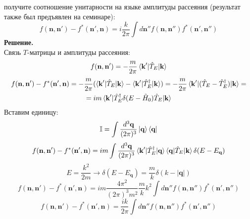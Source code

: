 \documentclass[12pt]{article}
\theoremstyle{definition}
\begin{document}
получите соотношение унитарности на языке амплитуды рассеяния (результат также был предъявлен на семинаре):
\begin{equation}
    f(\textbf{n}, \textbf{n}') - f^*(\textbf{n}',\textbf{n}) = i\frac{k}{2\pi}\int d\textbf{n}''f(\textbf{n},\textbf{n}'')f^*(\textbf{n}', \textbf{n}'')
\end{equation}
\textbf{Решение.}\\
Связь $T$-матрицы и амплитуды рассеяния:
\begin{equation}
    f(\textbf{n},\textbf{n}')=-\frac{m}{2\pi}\braket{\textbf{k}'|\hat{T}_E|\textbf{k}}
\end{equation}
\begin{multline}
    f(\textbf{n},\textbf{n}')-f^*(\textbf{n}',\textbf{n})=-\frac{m}{2\pi}(\braket{\textbf{k}'|\hat{T}_E|\textbf{k}}-\braket{\textbf{k}'|\hat{T}^\dagger_E|\textbf{k}})=-\frac{m}{2\pi}\braket{\textbf{k}'|(\hat{T}_E-\hat{T}^\dagger_E)|\textbf{k}}=\\=im\braket{\textbf{k}'|\hat{T}^\dagger_E\delta(E-\hat{H}_0)\hat{T}_E|\textbf{k}}
\end{multline}
Вставим единицу:
\begin{equation}
    \mathbb{I}=\int\frac{d^3\textbf{q}}{(2\pi)^3}\ket{\textbf{q}}\bra{\textbf{q}}
\end{equation}
\begin{equation}
    f(\textbf{n},\textbf{n}')-f^*(\textbf{n}',\textbf{n})=im\int\frac{d^3\textbf{q}}{(2\pi)^3}\braket{\textbf{k}'|\hat{T}^\dagger_E|\textbf{q}}\braket{\textbf{q}|\hat{T}_E|\textbf{k}}\delta(E-E_{\textbf{q}})
\end{equation}
\begin{equation}
    E=\frac{k^2}{2m}\rightarrow\delta(E-E_{\textbf{q}})=\frac{m}{k}\delta(k-|\textbf{q}|)
\end{equation}
\begin{equation}
    f(\textbf{n},\textbf{n}')-f^*(\textbf{n}',\textbf{n})=im\frac{4\pi^2}{(2\pi)^3m^2}\frac{m}{k}k^2\int d\textbf{n}''f(\textbf{n},\textbf{n}'')f^*(\textbf{n}',\textbf{n}'')
\end{equation}
\begin{equation}
    \boxed{f(\textbf{n},\textbf{n}')-f^*(\textbf{n}',\textbf{n})=\frac{ik}{2\pi}\int d\textbf{n}''f(\textbf{n},\textbf{n}'')f^*(\textbf{n}',\textbf{n}'')}
\end{equation}
\end{document}
